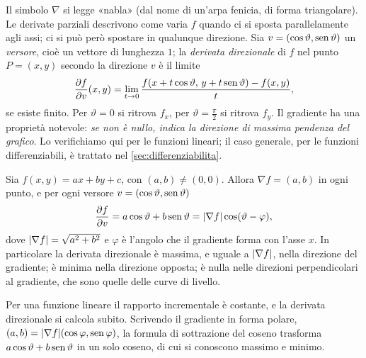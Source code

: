 Il simbolo $\nabla$ si legge «nabla» (dal nome di un'arpa fenicia, di forma triangolare).
Le derivate parziali descrivono come varia $f$ quando ci si sposta parallelamente agli
assi; ci si può però spostare in qualunque direzione. Sia $v=(\cos\vartheta,\operatorname{sen}\vartheta)$
un \emph{versore}, cioè un vettore di lunghezza $1$; la \emph{derivata direzionale} di $f$
nel punto $P=(x,y)$ secondo la direzione $v$ è il limite
\begin{equation}\label{eq:derivata-direzionale}
  \frac{\partial f}{\partial v}(x,y)=\lim_{t\to0}\frac{f(x+t\cos\vartheta,\,y+t\operatorname{sen}\vartheta)-f(x,y)}{t},
\end{equation}
se esiste finito. Per $\vartheta=0$ si ritrova $f_{x}$, per $\vartheta=\frac\pi2$ si ritrova
$f_{y}$. Il gradiente ha una proprietà notevole: \emph{se non è nullo, indica la direzione
di massima pendenza del grafico}. Lo verifichiamo qui per le funzioni lineari; il caso
generale, per le funzioni differenziabili, è trattato nel \cref{sec:differenziabilita}.

\begin{proposizione}\label{prop:gradiente-lineare}
Sia $f(x,y)=ax+by+c$, con $(a,b)\neq(0,0)$. Allora $\nabla f=(a,b)$ in ogni punto, e per
ogni versore $v=(\cos\vartheta,\operatorname{sen}\vartheta)$
\begin{equation}\label{eq:direzionale-lineare}
  \frac{\partial f}{\partial v}=a\cos\vartheta+b\operatorname{sen}\vartheta=\lvert \nabla f\rvert\cos(\vartheta-\varphi),
\end{equation}
dove $\lvert \nabla f\rvert=\sqrt{a^{2}+b^{2}}$ e $\varphi$ è l'angolo che il gradiente forma con
l'asse $x$. In particolare la derivata direzionale è massima, e uguale a $\lvert \nabla f\rvert$,
nella direzione del gradiente; è minima nella direzione opposta; è nulla nelle direzioni
perpendicolari al gradiente, che sono quelle delle curve di livello.
\end{proposizione}

\begin{schema}
\end{schema}

\begin{strategia}
Per una funzione lineare il rapporto incrementale è costante, e la derivata direzionale
si calcola subito. Scrivendo il gradiente in forma polare,
$(a,b)=\lvert \nabla f\rvert(\cos\varphi,\operatorname{sen}\varphi)$, la formula di sottrazione del coseno
trasforma $a\cos\vartheta+b\operatorname{sen}\vartheta$ in un solo coseno, di cui si conoscono massimo e
minimo.
\end{strategia}

